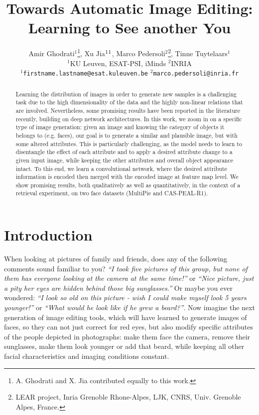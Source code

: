 \documentclass[10pt,twocolumn,letterpaper]{article}
\begin{document}
\title{Towards Automatic Image Editing: Learning to See another You}

\author{Amir Ghodrati$^{1}$\thanks{A. Ghodrati and X. Jia contributed equally to this work.},
Xu Jia$^{1}\footnotemark[1]$, Marco Pedersoli$^2$\thanks{LEAR project, Inria Grenoble Rhone-Alpes, LJK, CNRS, Univ. Grenoble Alpes, France.}, Tinne Tuytelaars$^1$ \\
$^{1}$KU Leuven, ESAT-PSI, iMinds \qquad  $^{2}$INRIA \\
$^{1}${\tt\small firstname.lastname@esat.kuleuven.be} \quad $^{2}${\tt\small marco.pedersoli@inria.fr}\\
}

\maketitle

\begin{abstract}
Learning the distribution of images in order to generate new samples
is a challenging task due to the high dimensionality of the data and
the highly non-linear relations that are involved.
Nevertheless, some promising results have been reported in the literature recently,
building on deep network architectures.
In this work, we zoom in on a specific type of image generation:
given an image and knowing the category of objects it belongs to (e.g. faces),
our goal is to generate a similar and plausible image, but with some altered attributes.
This is particularly challenging, as the model needs to learn to disentangle
the effect of each attribute and to apply a desired attribute change to a given input image, while keeping the other attributes and overall object appearance intact.
To this end, we learn a convolutional network, where the desired attribute information
is encoded then merged with the encoded image at feature map level.
We show promising results, both qualitatively as well as quantitatively, in the context of a retrieval experiment, on two face datasets (MultiPie and CAS-PEAL-R1).
\end{abstract}

\section{Introduction}
\label{sec:intro}

When looking at pictures of family and friends, does any of the following comments sound familiar to you?
{\em``I took five pictures of this group, but none of them has everyone looking at the camera at the same time!''}
or {\em``Nice picture, just a pity her eyes are hidden behind those big sunglasses.''} Or maybe you ever wondered:
{\em``I look so old on this picture - wish I could make myself look 5 years younger!''} or {\em``What would he look like if he grew a beard?''}.
Now imagine the next generation of image editing tools, which will have learned to generate images of faces, so they can not just correct for red eyes, but also modify specific attributes of the people depicted in photographs: make them face the camera, remove their sunglasses, make them look younger or add that beard, while keeping all other facial characteristics
and imaging conditions constant.
\end{document}
